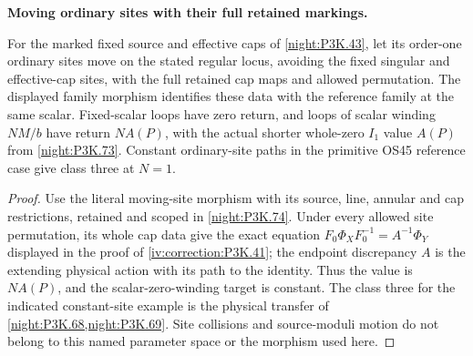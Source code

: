 \begin{proposition}\label{iv:correction:P3K.43}
\textbf{Moving ordinary sites with their full retained markings.}\par
For the marked fixed source and effective caps of
\cref{night:P3K.43}, let its order-one ordinary sites move on
the stated regular locus, avoiding the fixed singular and
effective-cap sites, with the full retained cap maps and allowed
permutation. The displayed family morphism identifies these
data with the reference family at the same scalar. Fixed-scalar
loops have zero return, and loops of scalar winding \(NM/b\)
have return \(N A(P)\), with the actual shorter whole-zero
\(I_1\) value \(A(P)\) from \cref{night:P3K.73}.
Constant ordinary-site paths in the primitive OS45 reference
case give class three at \(N=1\).
\end{proposition}
\begin{proof}
Use the literal moving-site morphism with its source,
line, annular and cap restrictions, retained and scoped in
\cref{night:P3K.74}. Under every allowed site permutation,
its whole cap data give the exact equation
\(F_0\Phi_XF_0^{-1}=A^{-1}\Phi_Y\) displayed in the proof of
\cref{iv:correction:P3K.41}; the endpoint discrepancy \(A\)
is the extending physical action with its path to the identity.
Thus the value is \(N A(P)\), and the scalar-zero-winding
target is constant. The class three for the indicated
constant-site example is the physical transfer of
\cref{night:P3K.68,night:P3K.69}. Site collisions and
source-moduli motion do not belong to this named parameter
space or the morphism used here.
\end{proof}


